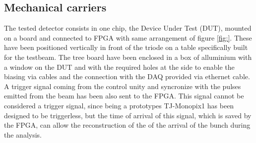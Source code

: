    \subsection{Mechanical carriers}
      The tested detector consists in one chip, the Device Under Test (DUT), mounted on a board and connected to FPGA with same arrangement of figure \ref{fig:}.
      These have been positioned vertically in front of the triode on a table specifically built for the testbeam. The tree board have been enclosed in a box of alluminium with a window on the DUT and with the required holes at the side to enable the biasing via cables and the connection with the DAQ provided via ethernet cable.       
      A trigger signal coming from the control unity and syncronize with the pulses emitted from the beam has been also sent to the FPGA.
      This signal cannot be considered a trigger signal, since being a prototypes TJ-Monopix1 has been designed to be triggerless, but the time of arrival of this signal, which is saved by the FPGA, can allow the reconstruction of the of the arrival of the bunch during the analysis.

